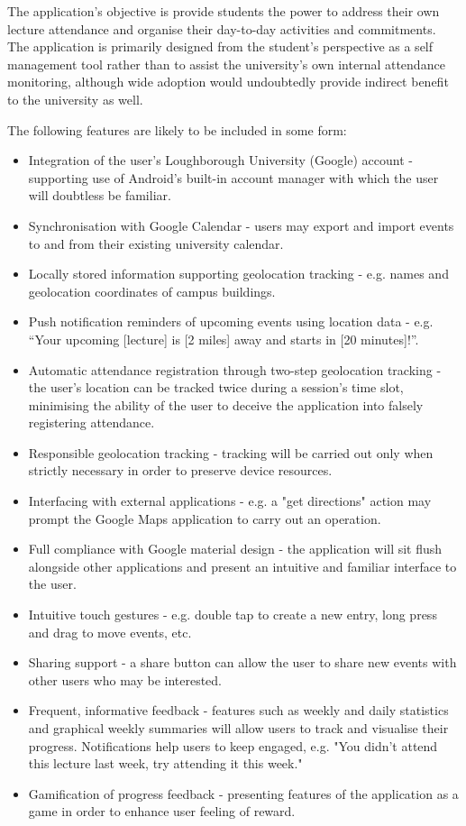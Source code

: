 \documentclass{article}
\begin{document}
The application's objective is provide students the power to address their own lecture attendance and organise their day-to-day activities and commitments. The application is primarily designed from the student's perspective as a self management tool rather than to assist the university's own internal attendance monitoring, although wide adoption would undoubtedly provide indirect benefit to the university as well.

The following features are likely to be included in some form:

\begin{itemize}
    \item Integration of the user's Loughborough University (Google) account - supporting use of Android's built-in account manager with which the user will doubtless be familiar.
    \item Synchronisation with Google Calendar - users may export and import events to and from their existing university calendar.
    \item Locally stored information supporting geolocation tracking - e.g. names and geolocation coordinates of campus buildings.
    \item Push notification reminders of upcoming events using location data - e.g. ``Your upcoming [lecture] is [2 miles] away and starts in [20 minutes]!''.
    \item Automatic attendance registration through two-step geolocation tracking - the user's location can be tracked twice during a session's time slot, minimising the ability of the user to deceive the application into falsely registering attendance. 
    \item Responsible geolocation tracking - tracking will be carried out only when strictly necessary in order to preserve device resources.
    \item Interfacing with external applications - e.g. a "get directions" action may prompt the Google Maps application to carry out an operation.
    \item Full compliance with Google material design - the application will sit flush alongside other applications and present an intuitive and familiar interface to the user.
    \item Intuitive touch gestures - e.g. double tap to create a new entry, long press and drag to move events, etc.
    \item Sharing support - a share button can allow the user to share new events with other users who may be interested.
    \item Frequent, informative feedback - features such as weekly and daily statistics and graphical weekly summaries will allow users to track and visualise their progress. Notifications help users to keep engaged, e.g. "You didn't attend this lecture last week, try attending it this week."
    \item Gamification of progress feedback - presenting features of the application as a game in order to enhance user feeling of reward.
\end{itemize}
\end{document}
